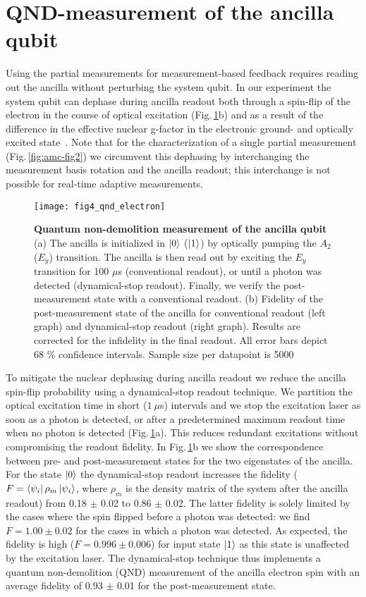 \section{QND-measurement of the ancilla qubit}
Using the partial measurements for measurement-based feedback requires reading out the ancilla without perturbing the system qubit. In our experiment the system qubit can dephase during ancilla readout both through a spin-flip of the electron in the course of optical excitation (Fig.\,\ref{fig:amc-fig4}b) and as a result of the difference in the effective nuclear g-factor in the electronic ground- and optically excited state~\cite{Jiang_PRL_2008}. Note that for the characterization of a single partial measurement (Fig.\,\ref{fig:amc-fig2}) we circumvent this dephasing by interchanging the measurement basis rotation and the ancilla readout; this interchange is not possible for real-time adaptive measurements.

\begin{figure*}
	\centering
	\texttt{[image: fig4\_qnd\_electron]}
	\caption{\label{fig:amc-fig4} \textbf{Quantum non-demolition measurement of the ancilla qubit} (a) The ancilla is initialized in $\left|0\right>$ ($\left|1\right>$) by optically pumping the $A_2$ ($E_y$) transition. The ancilla is then read out by exciting the $E_y$ transition for 100 $\mu$s (conventional readout), or until a photon was detected (dynamical-stop readout). Finally, we verify the post-measurement state with a conventional readout. (b) Fidelity of the post-measurement state of the ancilla for conventional readout (left graph) and dynamical-stop readout (right graph). Results are corrected for the infidelity in the final readout.  All error bars depict 68 $\%$ confidence intervals. Sample size per datapoint is 5000 }
\end{figure*}

To mitigate the nuclear dephasing during ancilla readout we reduce the ancilla spin-flip probability using a dynamical-stop readout technique. We partition the optical excitation time in short ($1~ \mu$s) intervals and we stop the excitation laser as soon as a photon is detected, or after a predetermined maximum readout time when no photon is detected (Fig.\,\ref{fig:amc-fig4}a). This reduces redundant excitations without compromising the readout fidelity. In Fig.\,\ref{fig:amc-fig4}b we show the correspondence between pre- and post-measurement states for the two eigenstates of the ancilla. For the state $\left|0\right>$ the dynamical-stop readout increases the fidelity ($F = \left<\psi_i\right|\rho_m \left|\psi_i\right>$, where $\rho_m$ is the density matrix of the system after the ancilla readout) from 0.18 $\pm$ 0.02 to 0.86 $\pm$ 0.02. The latter fidelity is solely limited by the cases where the spin flipped before a photon was detected: we find $F = 1.00 \pm 0.02$ for the cases in which a photon was detected. As expected, the fidelity is high ($F = 0.996 \pm 0.006$) for input state $\left|1\right>$ as this state is unaffected by the excitation laser. The dynamical-stop technique thus implements a quantum non-demolition (QND) measurement of the ancilla electron spin with an average fidelity of 0.93 $\pm$ 0.01 for the post-measurement state.

